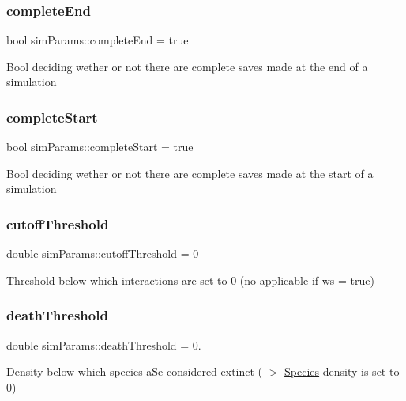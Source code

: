 \subsubsection{\texorpdfstring{complete\+End}{completeEnd}}
{\footnotesize\ttfamily bool sim\+Params\+::complete\+End = true}

Bool deciding wether or not there are complete saves made at the end of a simulation \mbox{\label{structsimParams_ad96e572c78fc800e13936b937f3addca}} 
\subsubsection{\texorpdfstring{complete\+Start}{completeStart}}
{\footnotesize\ttfamily bool sim\+Params\+::complete\+Start = true}

Bool deciding wether or not there are complete saves made at the start of a simulation \mbox{\label{structsimParams_a11c37c3a1d0f6470dd7b7c25fe7a8d11}} 
\subsubsection{\texorpdfstring{cutoff\+Threshold}{cutoffThreshold}}
{\footnotesize\ttfamily double sim\+Params\+::cutoff\+Threshold = 0}

Threshold below which interactions are set to 0 (no applicable if ws = true) \mbox{\label{structsimParams_aec04ef00f25e3bb5585a7a4b50c32b9a}} 
\subsubsection{\texorpdfstring{death\+Threshold}{deathThreshold}}
{\footnotesize\ttfamily double sim\+Params\+::death\+Threshold = 0.}

Density below which species a\+Se considered extinct (-\/$>$ \hyperlink{classSpecies}{Species} density is set to 0) \mbox{\label{structsimParams_a1d2d1053c8780cea2eb1f703b1bcafd0}} 

